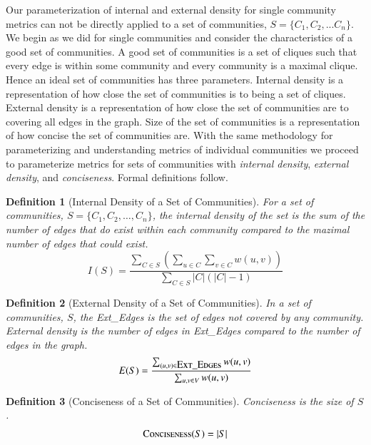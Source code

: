 \documentclass[phd,tocprelim]{cornell}
\newtheorem{definition}{Definition}
\begin{document}
Our parameterization of internal and external density for single community metrics can not be directly applied to a set of communities, $S = \{C_1,C_2,...C_n\}$. We begin as we did for single communities and consider the characteristics of a good set of communities.  A good set of communities is a set of cliques such that every edge is within some community and every community is a maximal clique. Hence an ideal set of communities has three parameters. Internal density is a representation of how close the set of communities is to being a set of cliques. External density is a representation of how close the set of communities are to covering all edges in the graph. Size of the set of communities is a representation of how concise the set of communities are. With the same methodology for parameterizing and understanding metrics of individual communities we proceed to parameterize metrics for sets of communities with {\it internal density}, {\it external density}, and {\it conciseness}.  Formal definitions follow.

\begin{definition}[Internal Density of a Set of Communities] For a set of communities, $S = \{C_1, C_2, \dots, C_n\}$, the internal density of the set is the sum of the number of edges that do exist within each community compared to the mazimal number of edges that could exist.
\begin{equation}
I(S) = \frac{\sum_{C \in S} \left( \sum_{u \in C} \sum_{v \in C} w(u,v)\right)}{\sum_{C \in S}|C|(|C| - 1)}
\end{equation}
\label{def_int_set}
\end{definition}

\begin{definition}[External Density of a Set of Communities] In a set of communities, $S$, the {\sc Ext\_Edges} is the set of edges not covered by any community.  External density is the number of edges in {\sc Ext\_Edges} compared to the number of edges in the graph.
\begin{equation}
E(S) = \frac{\sum_{(u, v) \in \mbox{\sc Ext\_Edges}} w(u,v)} {\sum_{u,v \in V}w(u,v)}
\end{equation}
\label{def_ext_set}
\end{definition}

\begin{definition}[Conciseness of a Set of Communities]  Conciseness is the size of $S$.
\begin{equation}
\mbox{\sc Conciseness}(S) = |S|
\end{equation}
\label{def_conciseness}
\end{definition}
\end{document}
